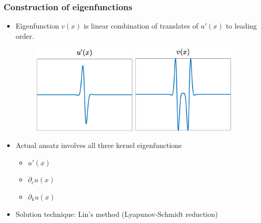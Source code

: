\documentclass[16pt]{beamer}
\begin{document}
\begin{frame}
\frametitle{Construction of eigenfunctions}
\begin{itemize}
\item Eigenfunction $v(x)$ is linear combination of translates of $u'(x)$ to leading order.
    	\begin{figure}
		\begin{center}
		\includegraphics[width=5cm]{images/singleprime.eps}
		\includegraphics[width=5cm]{images/eigenfunction.eps}
		\end{center}
		\end{figure}
\item Actual ansatz involves all three kernel eigenfunctions
\begin{itemize}
	\item $u'(x)$
	\item $\partial_c u(x)$
	\item $\partial_k u(x)$
\end{itemize}
\vspace{0.25cm}
\item Solution technique: Lin's method (Lyapunov-Schmidt reduction)
\end{itemize}
\end{frame}
\end{document}
